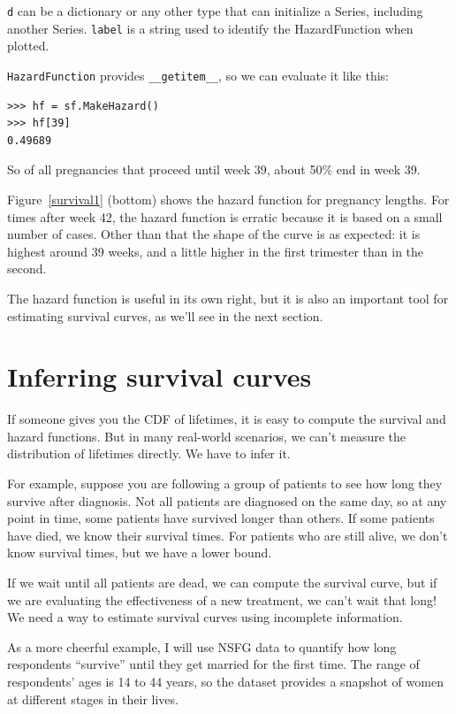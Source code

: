 \documentclass[12pt]{book}
\begin{document}
\verb"d" can be a dictionary or any other type that can initialize
a Series, including another Series.  \verb"label" is a string used
to identify the HazardFunction when plotted.

\verb"HazardFunction" provides \verb"__getitem__", so we can evaluate
it like this:

\begin{verbatim}
>>> hf = sf.MakeHazard()
>>> hf[39]
0.49689
\end{verbatim}

So of all pregnancies that proceed until week 39, about
50\% end in week 39.

Figure~\ref{survival1} (bottom) shows the hazard function for
pregnancy lengths.  For times after week 42, the hazard function
is erratic because it is based on a small number of cases.
Other than that the shape of the curve is as expected: it is
highest around 39 weeks, and a little higher in the first
trimester than in the second.

The hazard function is useful in its own right, but it is also an
important tool for estimating survival curves, as we'll see in the
next section.


\section{Inferring survival curves}

If someone gives you the CDF of lifetimes, it is easy to compute the
survival and hazard functions.  But in many real-world
scenarios, we can't measure the distribution of lifetimes directly.
We have to infer it.

For example, suppose you are following a group of patients to see how
long they survive after diagnosis.  Not all patients are diagnosed on
the same day, so at any point in time, some patients have survived
longer than others.  If some patients have died, we know their
survival times.  For patients who are still alive, we don't know
survival times, but we have a lower bound.

If we wait until all patients are dead, we can compute the survival
curve, but if we are evaluating the effectiveness of a new treatment,
we can't wait that long!  We need a way to estimate survival curves
using incomplete information.

As a more cheerful example, I will use NSFG data to quantify how
long respondents ``survive'' until they get married for the
first time.  The range of respondents' ages is 14 to 44 years, so
the dataset provides a snapshot of women at different stages in their
lives.
\end{document}

